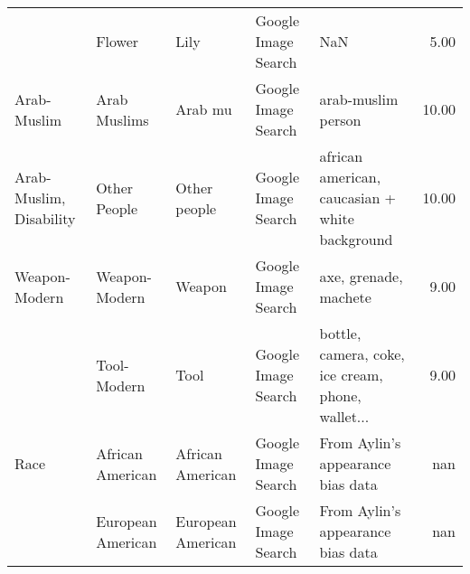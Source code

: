 \begin{tabular}{lllllr}
     & Flower &               Lily &  Google Image Search &                                                NaN &  5.00 \\
Arab-Muslim & Arab Muslims &            Arab mu &  Google Image Search &                                 arab-muslim person & 10.00 \\
Arab-Muslim, Disability & Other People &       Other people &  Google Image Search &     african american, caucasian + white background & 10.00 \\
Weapon-Modern & Weapon-Modern &             Weapon &  Google Image Search &                              axe, grenade, machete &  9.00 \\
     & Tool-Modern &               Tool &  Google Image Search &  bottle, camera, coke, ice cream, phone, wallet... &  9.00 \\
Race & African American &   African American &  Google Image Search &                  From Aylin's appearance bias data &   nan \\
     & European American &  European American &  Google Image Search &                  From Aylin's appearance bias data &   nan \\
\bottomrule
\end{tabular}
